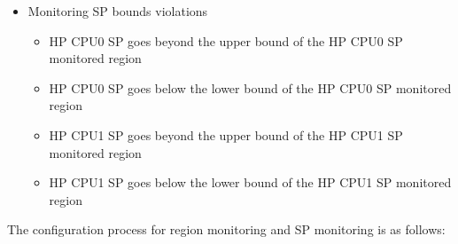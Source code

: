 \documentclass[main\_\_EN.tex]{subfiles}
\begin{document}
\begin{itemize}
\begin{itemize}
            \item HP CPU1 Peripheral bus writes in HP CPU1 region 1
        \end{itemize}
    \item  Monitoring SP bounds violations
        \begin{itemize}
            \item HP CPU0 SP goes beyond the upper bound of the HP CPU0 SP monitored region
            \item HP CPU0 SP goes below the lower bound of the HP CPU0 SP monitored region
            \item HP CPU1 SP goes beyond the upper bound of the HP CPU1 SP monitored region
            \item HP CPU1 SP goes below the lower bound of the HP CPU1 SP monitored region
        \end{itemize}
\end{itemize}



The configuration process for region monitoring and SP monitoring is as follows:
\end{document}
